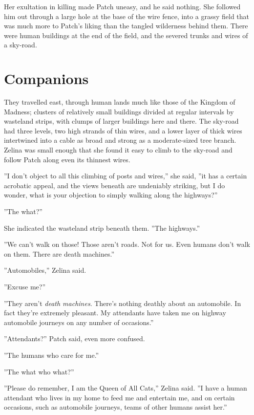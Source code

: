 \documentclass[12pt]{book}
\begin{document}
Her exultation in killing made Patch uneasy, and he said nothing. She followed him out through a large hole at the base of the wire fence, into a grassy field that was much more to Patch's liking than the tangled wilderness behind them. There were human buildings at the end of the field, and the severed trunks and wires of a sky-road.\par

\section{Companions}

 They travelled east, through human lands much like those of the Kingdom of Madness; clusters of relatively small buildings divided at regular intervals by wasteland strips, with clumps of larger buildings here and there. The sky-road had three levels, two high strands of thin wires, and a lower layer of thick wires intertwined into a cable as broad and strong as a moderate-sized tree branch. Zelina was small enough that she found it easy to climb to the sky-road and follow Patch along even its thinnest wires.\par
 ''I don't object to all this climbing of posts and wires,'' she said, ''it has a certain acrobatic appeal, and the views beneath are undeniably striking, but I do wonder, what is your objection to simply walking along the highways?''\par
 ''The what?''\par
 She indicated the wasteland strip beneath them. ''The highways.''\par
 ''We can't walk on those! Those aren't roads. Not for us. Even humans don't walk on them. There are death machines.''\par
 ''Automobiles,'' Zelina said.\par
 ''Excuse me?''\par
 ''They aren't {\it death machines}. There's nothing deathly about an automobile. In fact they're extremely pleasant. My attendants have taken me on highway automobile journeys on any number of occasions.''\par
 ''Attendants?'' Patch said, even more confused.\par
 ''The humans who care for me.''\par
 ''The what who what?''\par
 ''Please do remember, I am the Queen of All Cats,'' Zelina said. ''I have a human attendant who lives in my home to feed me and entertain me, and on certain occasions, such as automobile journeys, teams of other humans assist her.''\par
\end{document}
